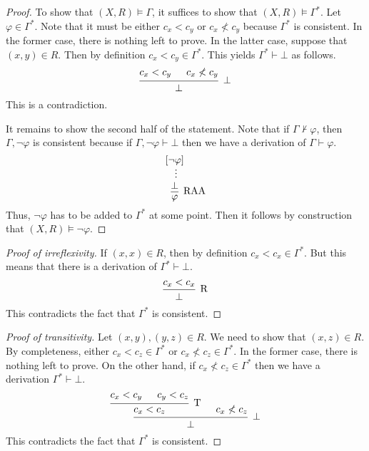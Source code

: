\documentclass[a4paper]{article}
\begin{document}
\begin{enumerate}
\begin{proof}
    To show that $(X,R) \vDash \Gamma$, it suffices to show that $(X,R) \vDash \Gamma^*$.
    Let $\varphi \in \Gamma^*$.
    Note that it must be either $c_x < c_y$ or $c_x \nless c_y$ because $\Gamma^*$ is consistent.
    In the former case, there is nothing left to prove.
    In the latter case, suppose that $(x,y) \in R$.
    Then by definition $c_x < c_y \in \Gamma^*$.
    This yields $\Gamma^* \vdash \bot$ as follows.
    \[
      \begin{prooftree}
        \hypo{c_x < c_y}
        \hypo{c_x \nless c_y}
        \infer2[$\bot$]{\bot}
      \end{prooftree}
    \]
    This is a contradiction.

    It remains to show the second half of the statement.
    Note that if $\Gamma \nvdash \varphi$, then $\Gamma,\lnot\varphi$ is consistent because if $\Gamma,\lnot\varphi \vdash \bot$ then we have a derivation of $\Gamma \vdash \varphi$.
    \[
      \begin{prooftree}
        \hypo{[\lnot\varphi]}
        \ellipsis{}{\bot}
        \infer1[RAA]{\varphi}
      \end{prooftree}
    \]
    Thus, $\lnot\varphi$ has to be added to $\Gamma^*$ at some point.
    Then it follows by construction that $(X,R) \vDash \lnot\varphi$.
  \end{proof}
  \begin{proof}[Proof of irreflexivity]
    If $(x,x) \in R$, then by definition $c_{x} < c_{x} \in \Gamma^{*}$.
    But this means that there is a derivation of $\Gamma^* \vdash \bot$.
    \[
      \begin{prooftree}
        \hypo{c_{x} < c_{x}}
        \infer1[R]{\bot}
      \end{prooftree}
    \]
    This contradicts the fact that $\Gamma^*$ is consistent.
  \end{proof}
  \begin{proof}[Proof of transitivity]
    Let $(x,y),(y,z) \in R$.
    We need to show that $(x,z) \in R$.
    By completeness, either $c_{x} < c_{z} \in \Gamma^*$ or $c_{x} \nless c_{z} \in \Gamma^*$.
    In the former case, there is nothing left to prove.
    On the other hand, if $c_{x} \nless c_{z} \in \Gamma^*$ then we have a derivation $\Gamma^* \vdash \bot$.
    \[\begin{prooftree}
        \hypo{c_{x} < c_{y}}
        \hypo{c_{y} < c_{z}}
        \infer2[T]{c_{x} < c_{z}}
        \hypo{c_{x} \nless c_{z}}
        \infer2[$\bot$]{\bot}
      \end{prooftree}\]
    This contradicts the fact that $\Gamma^*$ is consistent.
  \end{proof}
  

\end{enumerate}
\end{document}
